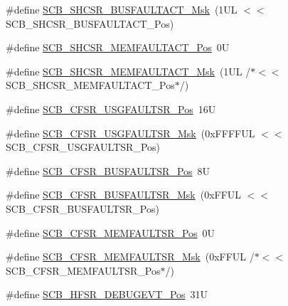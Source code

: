 \begin{DoxyCompactItemize}
\item 
\#define \hyperlink{group___c_m_s_i_s___s_c_b_ga9d7a8b1054b655ad08d85c3c535d4f73}{S\-C\-B\-\_\-\-S\-H\-C\-S\-R\-\_\-\-B\-U\-S\-F\-A\-U\-L\-T\-A\-C\-T\-\_\-\-Msk}~(1\-U\-L $<$$<$ S\-C\-B\-\_\-\-S\-H\-C\-S\-R\-\_\-\-B\-U\-S\-F\-A\-U\-L\-T\-A\-C\-T\-\_\-\-Pos)
\item 
\#define \hyperlink{group___c_m_s_i_s___s_c_b_ga7c856f79a75dcc1d1517b19a67691803}{S\-C\-B\-\_\-\-S\-H\-C\-S\-R\-\_\-\-M\-E\-M\-F\-A\-U\-L\-T\-A\-C\-T\-\_\-\-Pos}~0\-U
\item 
\#define \hyperlink{group___c_m_s_i_s___s_c_b_ga9147fd4e1b12394ae26eadf900a023a3}{S\-C\-B\-\_\-\-S\-H\-C\-S\-R\-\_\-\-M\-E\-M\-F\-A\-U\-L\-T\-A\-C\-T\-\_\-\-Msk}~(1\-U\-L /$\ast$$<$$<$ S\-C\-B\-\_\-\-S\-H\-C\-S\-R\-\_\-\-M\-E\-M\-F\-A\-U\-L\-T\-A\-C\-T\-\_\-\-Pos$\ast$/)
\item 
\#define \hyperlink{group___c_m_s_i_s___s_c_b_gac8e4197b295c8560e68e2d71285c7879}{S\-C\-B\-\_\-\-C\-F\-S\-R\-\_\-\-U\-S\-G\-F\-A\-U\-L\-T\-S\-R\-\_\-\-Pos}~16\-U
\item 
\#define \hyperlink{group___c_m_s_i_s___s_c_b_ga565807b1a3f31891f1f967d0fa30d03f}{S\-C\-B\-\_\-\-C\-F\-S\-R\-\_\-\-U\-S\-G\-F\-A\-U\-L\-T\-S\-R\-\_\-\-Msk}~(0x\-F\-F\-F\-F\-U\-L $<$$<$ S\-C\-B\-\_\-\-C\-F\-S\-R\-\_\-\-U\-S\-G\-F\-A\-U\-L\-T\-S\-R\-\_\-\-Pos)
\item 
\#define \hyperlink{group___c_m_s_i_s___s_c_b_ga555a24f4f57d199f91d1d1ab7c8c3c8a}{S\-C\-B\-\_\-\-C\-F\-S\-R\-\_\-\-B\-U\-S\-F\-A\-U\-L\-T\-S\-R\-\_\-\-Pos}~8\-U
\item 
\#define \hyperlink{group___c_m_s_i_s___s_c_b_ga26dc1ddfdc37a6b92597a6f7e498c1d6}{S\-C\-B\-\_\-\-C\-F\-S\-R\-\_\-\-B\-U\-S\-F\-A\-U\-L\-T\-S\-R\-\_\-\-Msk}~(0x\-F\-F\-U\-L $<$$<$ S\-C\-B\-\_\-\-C\-F\-S\-R\-\_\-\-B\-U\-S\-F\-A\-U\-L\-T\-S\-R\-\_\-\-Pos)
\item 
\#define \hyperlink{group___c_m_s_i_s___s_c_b_ga91f41491cec5b5acca3fbc94efbd799e}{S\-C\-B\-\_\-\-C\-F\-S\-R\-\_\-\-M\-E\-M\-F\-A\-U\-L\-T\-S\-R\-\_\-\-Pos}~0\-U
\item 
\#define \hyperlink{group___c_m_s_i_s___s_c_b_gad46716159a3808c9e7da22067d6bec98}{S\-C\-B\-\_\-\-C\-F\-S\-R\-\_\-\-M\-E\-M\-F\-A\-U\-L\-T\-S\-R\-\_\-\-Msk}~(0x\-F\-F\-U\-L /$\ast$$<$$<$ S\-C\-B\-\_\-\-C\-F\-S\-R\-\_\-\-M\-E\-M\-F\-A\-U\-L\-T\-S\-R\-\_\-\-Pos$\ast$/)
\item 
\#define \hyperlink{group___c_m_s_i_s___s_c_b_ga300c90cfb7b35c82b4d44ad16c757ffb}{S\-C\-B\-\_\-\-H\-F\-S\-R\-\_\-\-D\-E\-B\-U\-G\-E\-V\-T\-\_\-\-Pos}~31\-U
\item 
$$
\end{DoxyCompactItemize}

